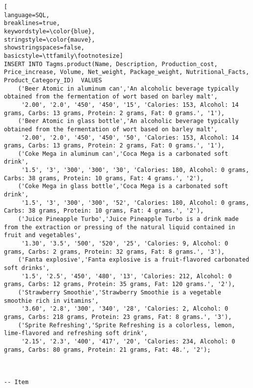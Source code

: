 \begin{lstlisting}[
language=SQL,
breaklines=true,
keywordstyle=\color{blue},
stringstyle=\color{mauve},
showstringspaces=false,
basicstyle=\ttfamily\footnotesize]
INSERT INTO Tagms.product(Name, Description, Production_cost, Price_increase, Volume, Net_weight, Package_weight, Nutritional_Facts, Product_Category_ID)  VALUES
    ('Beer Atomic in aluminum can','An alcoholic beverage typically obtained from the fermentation of wort based on barley malt',
     '2.00', '2.0', '450', '450', '15', 'Calories: 153, Alcohol: 14 grams, Carbs: 13 grams, Protein: 2 grams, Fat: 0 grams.', '1'),
    ('Beer Atomic in glass bottle','An alcoholic beverage typically obtained from the fermentation of wort based on barley malt',
     '2.00', '2.0', '450', '450', '50', 'Calories: 153, Alcohol: 14 grams, Carbs: 13 grams, Protein: 2 grams, Fat: 0 grams.', '1'),
    ('Coke Mega in aluminum can','Coca Mega is a carbonated soft drink',
     '1.5', '3', '300', '300', '30', 'Calories: 180, Alcohol: 0 grams, Carbs: 38 grams, Protein: 10 grams, Fat: 4 grams.', '2'),
    ('Coke Mega in glass bottle','Coca Mega is a carbonated soft drink',
     '1.5', '3', '300', '300', '52', 'Calories: 180, Alcohol: 0 grams, Carbs: 38 grams, Protein: 10 grams, Fat: 4 grams.', '2'),
    ('Juice Pineapple Turbo','Juice Pineapple Turbo is a drink made from the extraction or pressing of the natural liquid contained in fruit and vegetables',
     '1.30', '3.5', '500', '520', '25', 'Calories: 9, Alcohol: 0 grams, Carbs: 2 grams, Protein: 32 grams, Fat: 8 grams.', '3'),
    ('Fanta explosive','Fanta explosive is a fruit-flavored carbonated soft drinks',
     '1.5', '2.5', '450', '480', '13', 'Calories: 212, Alcohol: 0 grams, Carbs: 12 grams, Protein: 35 grams, Fat: 120 grams.', '2'),
    ('Strawberry Smoothie','Strawberry Smoothie is a vegetable smoothie rich in vitamins',
     '3.60', '2.8', '300', '340', '28', 'Calories: 2, Alcohol: 0 grams, Carbs: 218 grams, Protein: 23 grams, Fat: 8 grams.', '3'),
    ('Sprite Refreshing','Sprite Refreshing is a colorless, lemon, lime-flavored and refreshing soft drink',
     '2.15', '2.3', '400', '417', '20', 'Calories: 234, Alcohol: 0 grams, Carbs: 80 grams, Protein: 21 grams, Fat: 48.', '2');



-- Item


\end{lstlisting}

